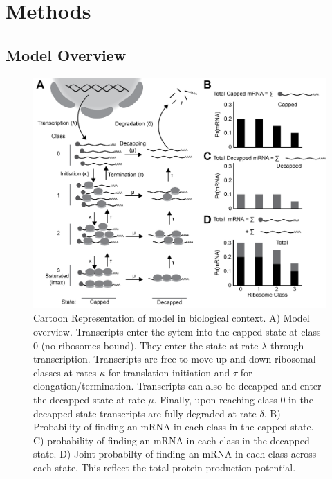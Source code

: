 \documentclass[review]{elsarticle}
\begin{document}
\section{Methods}\label{sec:description}
\subsection{Model Overview}
\pagebreak
\begin{figure}[!ht]
\centering
\includegraphics[width=150mm]{Images/Figure1_biomodel_V3.png}
\caption{Cartoon Representation of model in biological context. A) Model overview. Transcripts enter the sytem into the capped state at class 0 (no ribosomes bound). They enter the state at rate $\lambda$ through transcription. Transcripts are free to move up and down ribosomal classes at rates $\kappa$ for translation initiation and $\tau$ for elongation/termination. Transcripts can also be decapped and enter the decapped state at rate $\mu$. Finally, upon reaching class 0 in the decapped state transcripts are fully degraded at rate $\delta$. B) Probability of finding an mRNA in each class in the capped state. C) probability of finding an mRNA in each class in the decapped state. D) Joint probabilty of finding an mRNA in each class across each state. This reflect the total protein production potential.}
\end{figure}
\pagebreak
\end{document}
